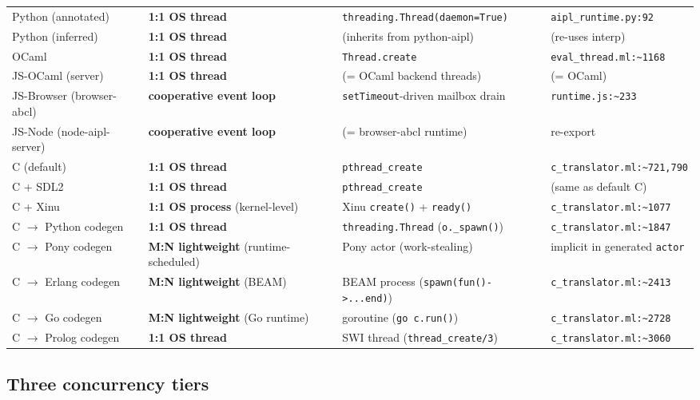 \documentclass[10pt,a4paper,landscape]{article}
\begin{document}
\begin{longtable}{p{4.0cm} p{4.0cm} p{6.0cm} p{4.0cm}}
  Python (annotated)        & \textbf{1:1 OS thread} & \texttt{threading.Thread(daemon=True)} & \texttt{aipl\_runtime.py:92} \\
  Python (inferred)         & \textbf{1:1 OS thread} & (inherits from python-aipl) & (re-uses interp) \\
  OCaml                     & \textbf{1:1 OS thread} & \texttt{Thread.create} & \texttt{eval\_thread.ml:\textasciitilde 1168} \\
  JS-OCaml (server)         & \textbf{1:1 OS thread} & (= OCaml backend threads) & (= OCaml) \\
  JS-Browser (browser-abcl) & \textbf{cooperative event loop} & \texttt{setTimeout}-driven mailbox drain & \texttt{runtime.js:\textasciitilde 233} \\
  JS-Node (node-aipl-server)& \textbf{cooperative event loop} & (= browser-abcl runtime) & re-export \\
  C (default)               & \textbf{1:1 OS thread} & \texttt{pthread\_create} & \texttt{c\_translator.ml:\textasciitilde 721,790} \\
  C + SDL2                  & \textbf{1:1 OS thread} & \texttt{pthread\_create} & (same as default C) \\
  C + Xinu                  & \textbf{1:1 OS process} (kernel-level) & Xinu \texttt{create()} + \texttt{ready()} & \texttt{c\_translator.ml:\textasciitilde 1077} \\
  C $\to$ Python codegen    & \textbf{1:1 OS thread} & \texttt{threading.Thread} (\texttt{o.\_spawn()}) & \texttt{c\_translator.ml:\textasciitilde 1847} \\
  C $\to$ Pony codegen      & \textbf{M:N lightweight} (runtime-scheduled) & Pony actor (work-stealing) & implicit in generated \texttt{actor} \\
  C $\to$ Erlang codegen    & \textbf{M:N lightweight} (BEAM) & BEAM process (\texttt{spawn(fun()->...end)}) & \texttt{c\_translator.ml:\textasciitilde 2413} \\
  C $\to$ Go codegen        & \textbf{M:N lightweight} (Go runtime) & goroutine (\texttt{go c.run()}) & \texttt{c\_translator.ml:\textasciitilde 2728} \\
  C $\to$ Prolog codegen    & \textbf{1:1 OS thread} & SWI thread (\texttt{thread\_create/3}) & \texttt{c\_translator.ml:\textasciitilde 3060} \\
  \bottomrule
\end{longtable}

\subsection*{Three concurrency tiers}
\end{document}
